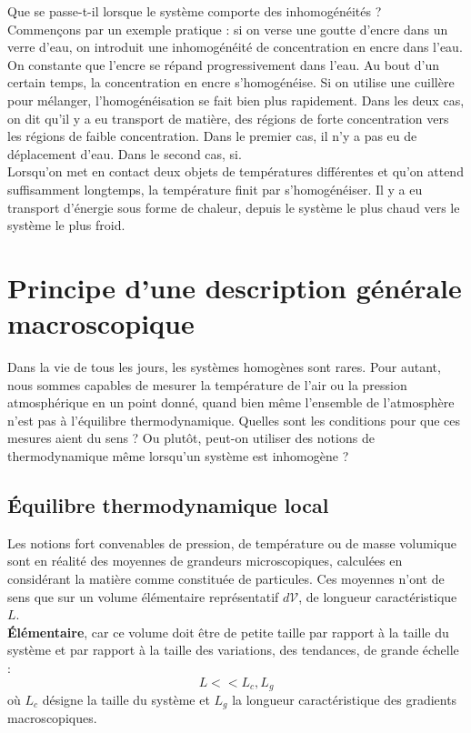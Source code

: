 \documentclass[11pt,a4paper]{report}
\begin{document}
Que se passe-t-il lorsque le système comporte des inhomogénéités ?\\ 

Commençons par un exemple pratique : si on verse une goutte d'encre dans un verre d'eau, on introduit une inhomogénéité de concentration en encre dans l'eau. On constante que l'encre se répand progressivement dans l'eau. Au bout d'un certain temps, la concentration en encre s'homogénéise. Si on utilise une cuillère pour mélanger, l'homogénéisation se fait bien plus rapidement. Dans les deux cas, on dit qu'il y a eu transport de matière, des régions de forte concentration vers les régions de faible concentration. Dans le premier cas, il n'y a pas eu de déplacement d'eau. Dans le second cas, si.\\ 

Lorsqu'on met en contact deux objets de températures différentes et qu'on attend suffisamment longtemps, la température finit par s'homogénéiser. Il y a eu transport d'énergie sous forme de chaleur, depuis le système le plus chaud vers le système le plus froid.\\

\newpage
\section{Principe d'une description générale macroscopique}

Dans la vie de tous les jours, les systèmes homogènes sont rares. Pour autant, nous sommes capables de mesurer la température de l'air ou la pression atmosphérique en un point donné, quand bien même l'ensemble de l'atmosphère n'est pas à l'équilibre thermodynamique. Quelles sont les conditions pour que ces mesures aient du sens ? Ou plutôt, peut-on utiliser des notions de thermodynamique même lorsqu'un système est inhomogène ?

\subsection{Équilibre thermodynamique local}

	Les notions fort convenables de pression, de température ou de masse volumique sont en réalité 		des moyennes de grandeurs microscopiques, calculées en considérant la matière comme constituée 		de particules. Ces moyennes n'ont de sens que sur un volume élémentaire représentatif 
	$d\mathcal{V}$, de longueur caractéristique $L$.\\ 
	
	\textbf{Élémentaire}, car ce volume doit être de petite taille par rapport à la taille du 			système et par rapport à la taille des variations, des tendances, de grande échelle :
	\begin{equation}
		L << L_c, L_g
	\end{equation}		
	où $L_c$ désigne la taille du système et $L_g$ la longueur caractéristique des gradients 			macroscopiques.\\
	
\end{document}
